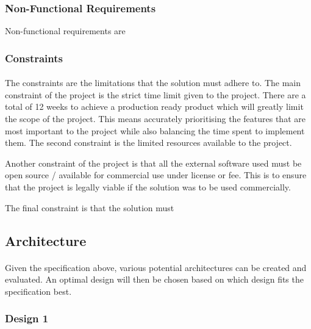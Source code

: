 \documentclass[12pt, conference, final, a4paper, onecolumn, compsoc]{IEEEtran}
\begin{document}
    \subsubsection*{Non-Functional Requirements}

    Non-functional requirements are

    \subsubsection*{Constraints}
    \paragraph{}

    The constraints are the limitations that the solution must adhere to. The
    main constraint of the project is the strict time limit given to the
    project. There are a total of 12 weeks to achieve a production ready product
    which will greatly limit the scope of the project. This means accurately
    prioritising the features that are most important to the project while also
    balancing the time spent to implement them. The second constraint is the
    limited resources available to the project.


    Another constraint of the project is that all the external software used
    must be open source / available for commercial use under license or fee.
    This is to ensure that the project is legally viable if the solution was to
    be used commercially.


    The final constraint is that the solution must %


    \subsection*{Architecture}

    \paragraph{}
    Given the specification above, various potential architectures can be
    created and evaluated. An optimal design will then be chosen based on which
    design fits the specification best.


    \subsubsection*{Design 1}
\end{document}
